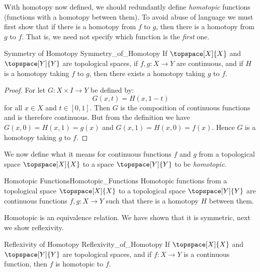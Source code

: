 \documentclass[oneside]{book}                                                  %
\begin{document}
                With homotopy now defined, we should redundantly define
                \textit{homotopic} functions (functions with a homotopy between
                them). To avoid abuse of language we must first show that if there
                is a homotopy from $f$ to $g$, then there is a homotopy from $g$ to
                $f$. That is, we need not specify which function is the
                \textit{first} one.
                \begin{ltheorem}{Symmetry of Homotopy}
                                {Symmetry_of_Homotopy}
                    If $\topspace[X]{X}$ and $\topspace[Y]{Y}$ are topological
                    spaces, if $f,g:X\rightarrow{Y}$ are continuous, and if $H$
                    is a homotopy taking $f$ to $g$, then there exists a
                    homotopy taking $g$ to $f$.
                \end{ltheorem}
                \begin{proof}
                    For let $G:X\times{I}\rightarrow{Y}$ be defined by:
                    \begin{equation}
                        G(x,t)=H(x,1-t)
                    \end{equation}
                    for all $x\in{X}$ and $t\in[0,1]$. Then $G$ is the
                    composition of continuous functions and is therefore
                    continuous. But from the definition we have
                    $G(x,0)=H(x,1)=g(x)$ and $G(x,1)=H(x,0)=f(x)$. Hence $G$ is
                    a homotopy taking $g$ to $f$.
                \end{proof}
                We now define what it means for continuous functions $f$ and $g$
                from a topological space $\topspace[X]{X}$ to a space
                $\topspace[Y]{Y}$ to be \textit{homotopic}.
                \begin{fdefinition}{Homotopic Functions}{Homotopic_Functions}
                    Homotopic functions from a topological space
                    $\topspace[X]{X}$ to a topological space $\topspace[Y]{Y}$
                    are continuous functions $f,g:{X}\rightarrow{Y}$ such that
                    there is a homotopy $H$ between them.
                \end{fdefinition}
                Homotopic is an equivalence relation. We have shown that it is
                symmetric, next we show reflexivity.
                \begin{ltheorem}{Reflexivity of Homotopy}
                                {Reflexivity_of_Homotopy}
                    If $\topspace[X]{X}$ and $\topspace[Y]{Y}$ are topological
                    spaces, and if $f:X\rightarrow{Y}$ is a continuous function,
                    then $f$ is homotopic to $f$.
                \end{ltheorem}
\end{document}
